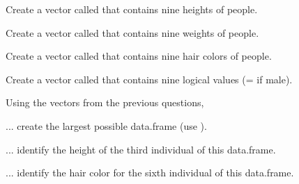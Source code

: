 \documentclass[10pt,openany]{book}\usepackage[]{graphicx}\usepackage[]{color}
\begin{document}
\begin{exsection}
  \item \label{revex:BasicsData1}\rhw{} Create a vector called  that contains nine heights of people. 
  \item \label{revex:BasicsData2}\rhw{} Create a vector called  that contains nine weights of people. 
  \item \label{revex:BasicsData3}\rhw{} Create a vector called  that contains nine hair colors of people. 
  \item \label{revex:BasicsData4}\rhw{} Create a vector called  that contains nine logical values (= if male). 
  \item \label{revex:BasicsData5}\rhw{} Using the vectors from the previous questions,  
  \begin{Enumerate}
    \item ... create the largest possible data.frame (use ).
    \item ... identify the height of the third individual of this data.frame.
    \item ... identify the hair color for the sixth individual of this data.frame.
  \end{Enumerate}
\end{exsection}
\end{document}
